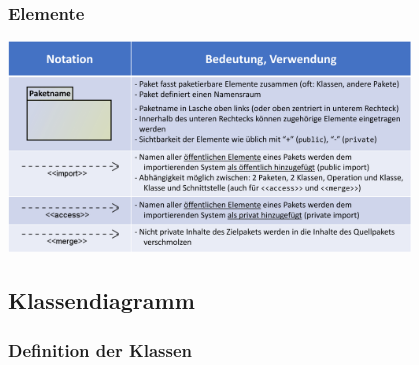 \documentclass[11pt, a4paper]{article}
\begin{document}
\subsubsection{Elemente}

\centering \includegraphics[width=0.8\textwidth]{Paket-03.png}


\newpage

\raggedright \subsection{Klassendiagramm}

\vspace{1em}

\raggedright \subsubsection{Definition der Klassen}

\vspace{1em}
\end{document}

